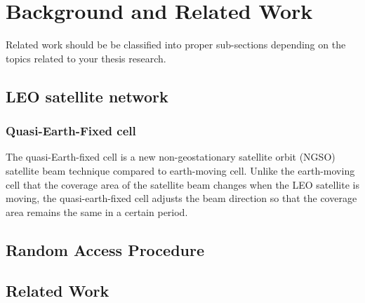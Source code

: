 \chapter{Background and Related Work}
\label{chap:background}


Related work should be be classified into proper sub-sections depending on the topics
related to your thesis research.
\section{LEO satellite network}

\subsection{Quasi-Earth-Fixed cell}

The quasi-Earth-fixed cell is a new non-geostationary satellite orbit (NGSO) satellite beam technique compared to earth-moving cell. Unlike the earth-moving cell that the coverage area of the satellite beam changes when the LEO satellite is moving, the quasi-earth-fixed cell adjusts the beam direction so that the coverage area remains the same in a certain period. 

\section{Random Access Procedure}


\section{Related Work}
